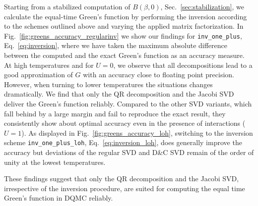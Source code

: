 \documentclass[submission, Phys]{SciPost}
\begin{document}
Starting from a stabilized computation of $B(\beta,0)$, Sec.~\ref{sec:stabilization}, we calculate the equal-time Green's function by performing the inversion according to the schemes outlined above and varying the applied matrix factorization. In Fig.~\ref{fig:greens_accuracy_regularinv} we show our findings for \texttt{inv\_one\_plus}, Eq.~\ref{eq:inversion}, where we have taken the maximum absolute difference between the computed and the exact Green's function as an accuracy measure. At high temperatures and for $U=0$, we observe that all decompositions lead to a good approximation of $G$ with an accuracy close to floating point precision. However, when turning to lower temperatures the situations changes dramatically. We find that only the QR decomposition and the Jacobi SVD deliver the Green's function reliably. Compared to the other SVD variants, which fall behind by a large margin and fail to reproduce the exact result, they consistently show about optimal accuracy even in the presence of interactions ($U=1$). As displayed in Fig.~\ref{fig:greens_accuracy_loh}, switching to the inversion scheme \texttt{inv\_one\_plus\_loh}, Eq.~\ref{eq:inversion_loh}, does generally improve the accuracy but deviations of the regular SVD and D\&C SVD remain of the order of unity at the lowest temperatures.

These findings suggest that only the QR decomposition and the Jacobi SVD, irrespective of the inversion procedure, are suited for computing the equal time Green's function in DQMC reliably.
\end{document}
